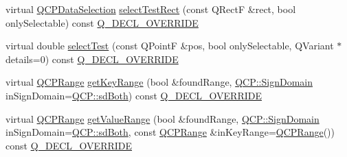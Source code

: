 \begin{DoxyCompactItemize}
\item 
virtual \mbox{\hyperlink{class_q_c_p_data_selection}{Q\+C\+P\+Data\+Selection}} \mbox{\hyperlink{class_q_c_p_statistical_box_a42febad6ad5e924a151434cc434b4ffc}{select\+Test\+Rect}} (const Q\+RectF \&rect, bool only\+Selectable) const \mbox{\hyperlink{qcustomplot_8h_a42cc5eaeb25b85f8b52d2a4b94c56f55}{Q\+\_\+\+D\+E\+C\+L\+\_\+\+O\+V\+E\+R\+R\+I\+DE}}
\item 
virtual double \mbox{\hyperlink{class_q_c_p_statistical_box_a1607fa92f829c631107c20ccb2d70a6d}{select\+Test}} (const Q\+PointF \&pos, bool only\+Selectable, Q\+Variant $\ast$details=0) const \mbox{\hyperlink{qcustomplot_8h_a42cc5eaeb25b85f8b52d2a4b94c56f55}{Q\+\_\+\+D\+E\+C\+L\+\_\+\+O\+V\+E\+R\+R\+I\+DE}}
\item 
virtual \mbox{\hyperlink{class_q_c_p_range}{Q\+C\+P\+Range}} \mbox{\hyperlink{class_q_c_p_statistical_box_a77d2d13301dfe60c13adfaa17fc1802f}{get\+Key\+Range}} (bool \&found\+Range, \mbox{\hyperlink{namespace_q_c_p_afd50e7cf431af385614987d8553ff8a9}{Q\+C\+P\+::\+Sign\+Domain}} in\+Sign\+Domain=\mbox{\hyperlink{namespace_q_c_p_afd50e7cf431af385614987d8553ff8a9aa38352ef02d51ddfa4399d9551566e24}{Q\+C\+P\+::sd\+Both}}) const \mbox{\hyperlink{qcustomplot_8h_a42cc5eaeb25b85f8b52d2a4b94c56f55}{Q\+\_\+\+D\+E\+C\+L\+\_\+\+O\+V\+E\+R\+R\+I\+DE}}
\item 
virtual \mbox{\hyperlink{class_q_c_p_range}{Q\+C\+P\+Range}} \mbox{\hyperlink{class_q_c_p_statistical_box_ab3388a21d0c2e86fbc0cba9c06ceb49b}{get\+Value\+Range}} (bool \&found\+Range, \mbox{\hyperlink{namespace_q_c_p_afd50e7cf431af385614987d8553ff8a9}{Q\+C\+P\+::\+Sign\+Domain}} in\+Sign\+Domain=\mbox{\hyperlink{namespace_q_c_p_afd50e7cf431af385614987d8553ff8a9aa38352ef02d51ddfa4399d9551566e24}{Q\+C\+P\+::sd\+Both}}, const \mbox{\hyperlink{class_q_c_p_range}{Q\+C\+P\+Range}} \&in\+Key\+Range=\mbox{\hyperlink{class_q_c_p_range}{Q\+C\+P\+Range}}()) const \mbox{\hyperlink{qcustomplot_8h_a42cc5eaeb25b85f8b52d2a4b94c56f55}{Q\+\_\+\+D\+E\+C\+L\+\_\+\+O\+V\+E\+R\+R\+I\+DE}}
\end{DoxyCompactItemize}
